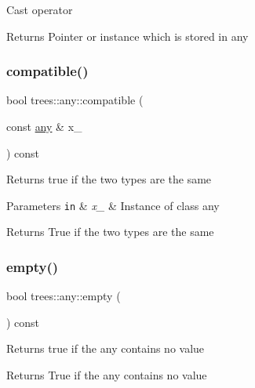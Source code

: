 Cast operator

\begin{DoxyReturn}{Returns}
Pointer or instance which is stored in any 
\end{DoxyReturn}
\mbox{\label{classtrees_1_1any_a1ea0044905276054696cd2c68988c221}} 
\subsubsection{\texorpdfstring{compatible()}{compatible()}}
{\footnotesize\ttfamily bool trees\+::any\+::compatible (\begin{DoxyParamCaption}\item[{const \hyperlink{classtrees_1_1any}{any} \&}]{x\+\_\+ }\end{DoxyParamCaption}) const\hspace{0.3cm}{\ttfamily [inline]}}

Returns true if the two types are the same


\begin{DoxyParams}[1]{Parameters}
\mbox{\tt in}  & {\em x\+\_\+} & Instance of class any \\
\hline
\end{DoxyParams}
\begin{DoxyReturn}{Returns}
True if the two types are the same 
\end{DoxyReturn}
\mbox{\label{classtrees_1_1any_a2bc0c0f86ee6baefd7d9efebad0fdada}} 
\subsubsection{\texorpdfstring{empty()}{empty()}}
{\footnotesize\ttfamily bool trees\+::any\+::empty (\begin{DoxyParamCaption}{ }\end{DoxyParamCaption}) const\hspace{0.3cm}{\ttfamily [inline]}}

Returns true if the any contains no value

\begin{DoxyReturn}{Returns}
True if the any contains no value 
\end{DoxyReturn}
\mbox{\label{classtrees_1_1any_af176250c5b4a965705c28b3fe4d150ad}} 
